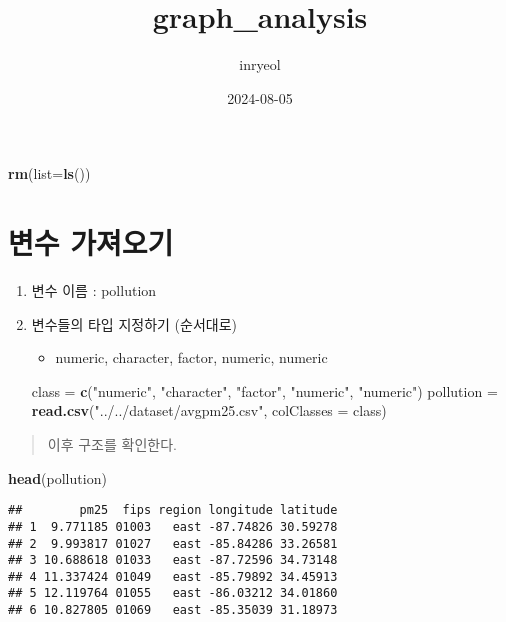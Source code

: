 \documentclass[
]{article}
\title{graph\_analysis}
\author{inryeol}
\date{2024-08-05}
\newenvironment{Shaded}{\begin{snugshade}}{\end{snugshade}}
\newcommand{\AttributeTok}[1]{\textcolor[rgb]{0.13,0.29,0.53}{#1}}
\newcommand{\FunctionTok}[1]{\textcolor[rgb]{0.13,0.29,0.53}{\textbf{#1}}}
\newcommand{\NormalTok}[1]{#1}
\newcommand{\OtherTok}[1]{\textcolor[rgb]{0.56,0.35,0.01}{#1}}
\newcommand{\StringTok}[1]{\textcolor[rgb]{0.31,0.60,0.02}{#1}}
\providecommand{\tightlist}{%
  \setlength{\itemsep}{0pt}\setlength{\parskip}{0pt}}
\begin{document}
\maketitle

\begin{Shaded}
\begin{Highlighting}[]
\FunctionTok{rm}\NormalTok{(}\AttributeTok{list=}\FunctionTok{ls}\NormalTok{())}
\end{Highlighting}
\end{Shaded}

\section{변수 가져오기}\label{uxbcc0uxc218-uxac00uxc838uxc624uxae30}

\begin{enumerate}
\def\labelenumi{\arabic{enumi}.}
\item
  변수 이름 : pollution
\item
  변수들의 타입 지정하기 (순서대로)

  \begin{itemize}
  \tightlist
  \item
    numeric, character, factor, numeric, numeric
  \end{itemize}

\begin{Shaded}
\begin{Highlighting}[]
\NormalTok{class }\OtherTok{=} \FunctionTok{c}\NormalTok{(}\StringTok{"numeric"}\NormalTok{, }\StringTok{"character"}\NormalTok{, }\StringTok{"factor"}\NormalTok{, }\StringTok{"numeric"}\NormalTok{, }\StringTok{"numeric"}\NormalTok{)}
\NormalTok{pollution }\OtherTok{=} \FunctionTok{read.csv}\NormalTok{(}\StringTok{"../../dataset/avgpm25.csv"}\NormalTok{, }\AttributeTok{colClasses =}\NormalTok{ class)}
\end{Highlighting}
\end{Shaded}
\end{enumerate}

\begin{quote}
이후 구조를 확인한다.
\end{quote}

\begin{Shaded}
\begin{Highlighting}[]
\FunctionTok{head}\NormalTok{(pollution)}
\end{Highlighting}
\end{Shaded}

\begin{verbatim}
##        pm25  fips region longitude latitude
## 1  9.771185 01003   east -87.74826 30.59278
## 2  9.993817 01027   east -85.84286 33.26581
## 3 10.688618 01033   east -87.72596 34.73148
## 4 11.337424 01049   east -85.79892 34.45913
## 5 12.119764 01055   east -86.03212 34.01860
## 6 10.827805 01069   east -85.35039 31.18973
\end{verbatim}
\end{document}
